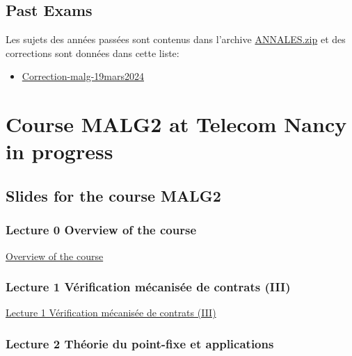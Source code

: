 \documentclass[ 12pt]{article}
\begin{document}
\subsection{Past Exams}
\label{sec:examens-passes}

Les sujets des années passées sont   contenus dans l'archive
\href{http://mery54.github.io/teaching/movex/lecturesnotes/ANNALES.zip}{ANNALES.zip}
et      des corrections sont données   dans cette liste:

\begin{itemize}
\item  \href{http://mery54.github.io/teaching/movex/lecturesnotes/Correction-malg-19mars2024.pdf}{Correction-malg-19mars2024}
\end{itemize}







\section{Course MALG2 at Telecom Nancy in progress }
\label{sec:course-mcfsi-at}


\subsection{Slides for the course MALG2}
\label{sec:slides}


\subsubsection{Lecture 0  {Overview of the course }}
  
  \href{http://mery54.github.io/teaching/movex/lecturesnotes/malglecture0.pdf}{Overview of the course }


   \subsubsection{Lecture 1 {Vérification  mécanisée de contrats} (III)}

   \href{http://mery54.github.io/teaching/movex/lecturesnotes/malglecture1.pdf}{Lecture
     1  Vérification  mécanisée de contrats (III)}


   
   \subsubsection{Lecture 2 {Théorie du point-fixe et applications}}
\end{document}
